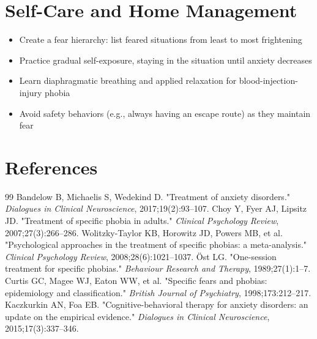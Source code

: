 \section*{Self-Care and Home Management}
\begin{itemize}
  \item Create a fear hierarchy: list feared situations from least to most frightening
  \item Practice gradual self-exposure, staying in the situation until anxiety decreases
  \item Learn diaphragmatic breathing and applied relaxation for blood-injection-injury phobia
  \item Avoid safety behaviors (e.g., always having an escape route) as they maintain fear
\end{itemize}

\section*{References}
\begin{thebibliography}{99}
 Bandelow B, Michaelis S, Wedekind D. "Treatment of anxiety disorders." \textit{Dialogues in Clinical Neuroscience}, 2017;19(2):93--107.
 Choy Y, Fyer AJ, Lipsitz JD. "Treatment of specific phobia in adults." \textit{Clinical Psychology Review}, 2007;27(3):266--286.
 Wolitzky-Taylor KB, Horowitz JD, Powers MB, et al. "Psychological approaches in the treatment of specific phobias: a meta-analysis." \textit{Clinical Psychology Review}, 2008;28(6):1021--1037.
 \"Ost LG. "One-session treatment for specific phobias." \textit{Behaviour Research and Therapy}, 1989;27(1):1--7.
 Curtis GC, Magee WJ, Eaton WW, et al. "Specific fears and phobias: epidemiology and classification." \textit{British Journal of Psychiatry}, 1998;173:212--217.
 Kaczkurkin AN, Foa EB. "Cognitive-behavioral therapy for anxiety disorders: an update on the empirical evidence." \textit{Dialogues in Clinical Neuroscience}, 2015;17(3):337--346.

\end{thebibliography}
